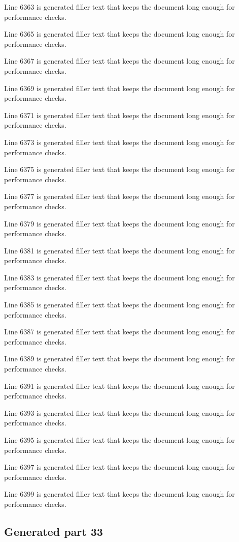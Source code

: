 Line 6363 is generated filler text that keeps the document long enough for performance checks.

Line 6365 is generated filler text that keeps the document long enough for performance checks.

Line 6367 is generated filler text that keeps the document long enough for performance checks.

Line 6369 is generated filler text that keeps the document long enough for performance checks.

Line 6371 is generated filler text that keeps the document long enough for performance checks.

Line 6373 is generated filler text that keeps the document long enough for performance checks.

Line 6375 is generated filler text that keeps the document long enough for performance checks.

Line 6377 is generated filler text that keeps the document long enough for performance checks.

Line 6379 is generated filler text that keeps the document long enough for performance checks.

Line 6381 is generated filler text that keeps the document long enough for performance checks.

Line 6383 is generated filler text that keeps the document long enough for performance checks.

Line 6385 is generated filler text that keeps the document long enough for performance checks.

Line 6387 is generated filler text that keeps the document long enough for performance checks.

Line 6389 is generated filler text that keeps the document long enough for performance checks.

Line 6391 is generated filler text that keeps the document long enough for performance checks.

Line 6393 is generated filler text that keeps the document long enough for performance checks.

Line 6395 is generated filler text that keeps the document long enough for performance checks.

Line 6397 is generated filler text that keeps the document long enough for performance checks.

Line 6399 is generated filler text that keeps the document long enough for performance checks.

\subsection{Generated part 33}

